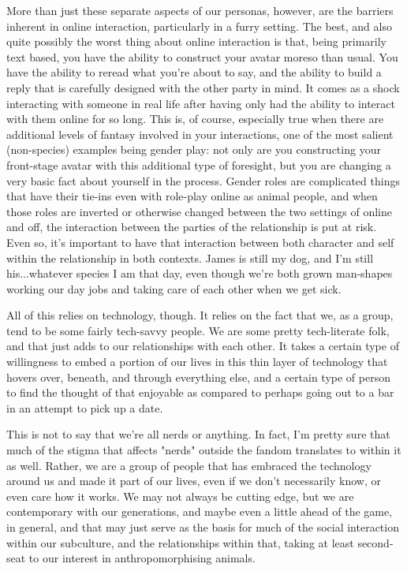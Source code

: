 More than just these separate aspects of our personas, however, are the barriers inherent in online interaction, particularly in a furry setting. The best, and also quite possibly the worst thing about online interaction is that, being primarily text based, you have the ability to construct your avatar moreso than usual. You have the ability to reread what you're about to say, and the ability to build a reply that is carefully designed with the other party in mind. It comes as a shock interacting with someone in real life after having only had the ability to interact with them online for so long. This is, of course, especially true when there are additional levels of fantasy involved in your interactions, one of the most salient (non-species) examples being gender play: not only are you constructing your front-stage avatar with this additional type of foresight, but you are changing a very basic fact about yourself in the process. Gender roles are complicated things that have their tie-ins even with role-play online as animal people, and when those roles are inverted or otherwise changed between the two settings of online and off, the interaction between the parties of the relationship is put at risk. Even so, it's important to have that interaction between both character and self within the relationship in both contexts. James is still my dog, and I'm still his...whatever species I am that day, even though we're both grown man-shapes working our day jobs and taking care of each other when we get sick.

All of this relies on technology, though. It relies on the fact that we, as a group, tend to be some fairly tech-savvy people. We are some pretty tech-literate folk, and that just adds to our relationships with each other. It takes a certain type of willingness to embed a portion of our lives in this thin layer of technology that hovers over, beneath, and through everything else, and a certain type of person to find the thought of that enjoyable as compared to perhaps going out to a bar in an attempt to pick up a date.

This is not to say that we're all nerds or anything. In fact, I'm pretty sure that much of the stigma that affects "nerds" outside the fandom translates to within it as well. Rather, we are a group of people that has embraced the technology around us and made it part of our lives, even if we don't necessarily know, or even care how it works. We may not always be cutting edge, but we are contemporary with our generations, and maybe even a little ahead of the game, in general, and that may just serve as the basis for much of the social interaction within our subculture, and the relationships within that, taking at least second-seat to our interest in anthropomorphising animals.

